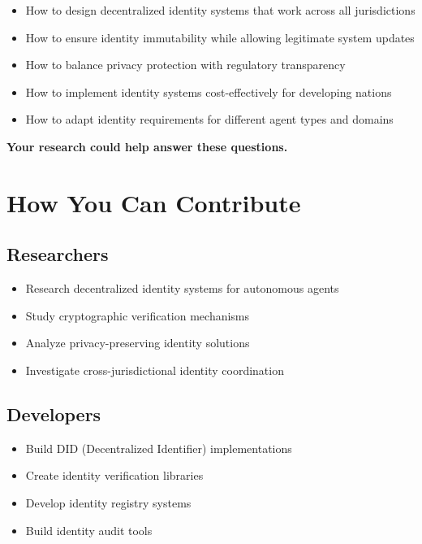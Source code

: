 \begin{itemize}
    \item How to design decentralized identity systems that work across all jurisdictions
    
    \item How to ensure identity immutability while allowing legitimate system updates
    
    \item How to balance privacy protection with regulatory transparency
    
    \item How to implement identity systems cost-effectively for developing nations
    
    \item How to adapt identity requirements for different agent types and domains
\end{itemize}

\textbf{Your research could help answer these questions.}

\vspace{0.5cm}

\section{How You Can Contribute}

\subsection{Researchers}

\begin{itemize}
    \item Research decentralized identity systems for autonomous agents
    \item Study cryptographic verification mechanisms
    \item Analyze privacy-preserving identity solutions
    \item Investigate cross-jurisdictional identity coordination
\end{itemize}

\subsection{Developers}

\begin{itemize}
    \item Build DID (Decentralized Identifier) implementations
    \item Create identity verification libraries
    \item Develop identity registry systems
    \item Build identity audit tools
\end{itemize}

